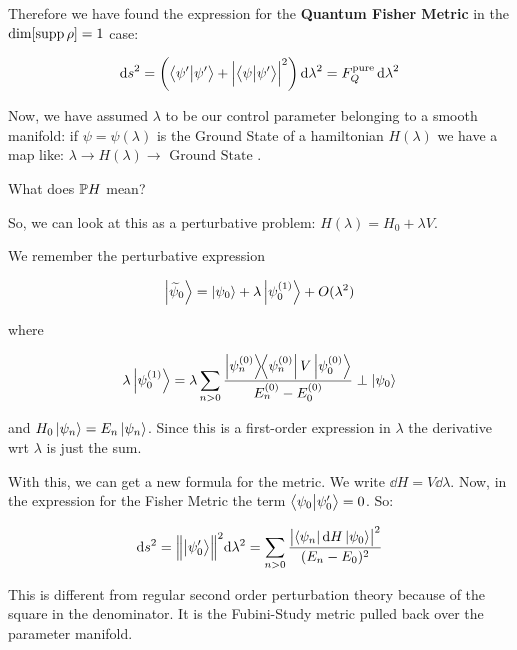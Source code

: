 \documentclass[main.tex]{subfiles}
\begin{document}
Therefore we have found the expression for the \textbf{Quantum Fisher Metric} in the \(\dim \qty[ \supp{\rho}] = 1\) case:

\begin{equation}
    \dd{s}^2 = \qty(\braket{\psi'}{\psi' } + \abs{\braket{\psi}{\psi'}}^2) \dd{\lambda}^2
    = F_Q^{\text{pure}} \dd{\lambda}^2
\end{equation}

Now, we have assumed \(\lambda\) to be our control parameter belonging to a smooth manifold: if \(\psi = \psi(\lambda)\) is the Ground State of a hamiltonian \(H(\lambda)\)
we have a map like: \(\lambda \rightarrow H(\lambda) \rightarrow \text{ Ground State }\).

\begin{greenbox}
    What does \(\P H\) mean?
\end{greenbox}

So, we can look at this as a perturbative problem: \(H(\lambda) = H_0 + \lambda V\).

We remember the perturbative expression

\begin{equation}
  \ket{\widetilde{\psi}_0 } = \ket{\psi_0} + \lambda \ket{\psi_0^{(1)}} + O(\lambda^2)
\end{equation}

where

\begin{equation}
  \lambda \ket{\psi_0 ^{(1)} } = \lambda \sum _{n>0} \frac{\dyad{\psi_n ^{(0)}} V \ket{\psi_0 ^{(0)} }}{E_n ^{(0)}  -  E_0 ^{(0)} } \perp \ket{\psi_0}
\end{equation}

and \(H_0 \ket{\psi_n} = E_n \ket{\psi_n}\). Since this is a first-order expression in \(\lambda \) the derivative wrt \(\lambda\) is just the sum.

With this, we can get a new formula for the metric. We write \(\dd{H} = V\dd\lambda  \). Now, in the expression for the Fisher Metric the term  \(\braket{\psi_0}{\psi_0 '} = 0 \). So:

\begin{equation} \label{eq:one-parameter-fisher-metric-1}
  \dd{s^2} = \norm{\ket{\psi_0 '}}^2 \dd\lambda^2 = \sum _{n>0}  \frac{\abs{\bra{\psi_n} \dd{H} \ket{\psi_0}}^2 }{(E_n - E_0)^2}
\end{equation}

This is different from regular second order perturbation theory because of the square in the denominator. It is the Fubini-Study metric pulled back over the parameter manifold.
\end{document}
